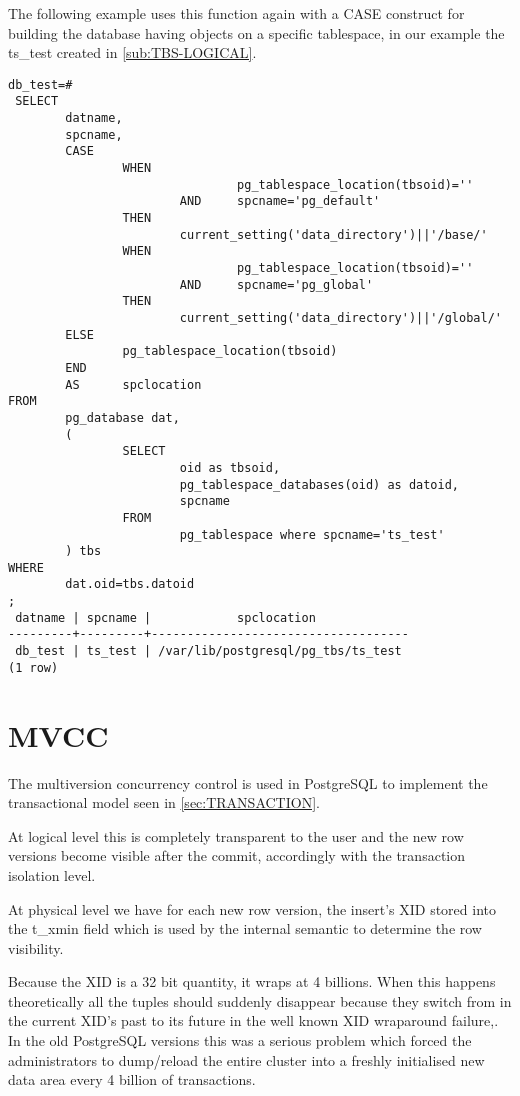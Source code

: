The following example uses this function again with a CASE construct for building the database having
objects on a specific tablespace, in our example the ts\_test created in \ref{sub:TBS-LOGICAL}.\newpage
\begin{lstlisting}[style=pgsql]
 db_test=#
 SELECT
        datname,
        spcname,
        CASE
                WHEN
                                pg_tablespace_location(tbsoid)=''
                        AND     spcname='pg_default'
                THEN
                        current_setting('data_directory')||'/base/'
                WHEN
                                pg_tablespace_location(tbsoid)=''
                        AND     spcname='pg_global'
                THEN
                        current_setting('data_directory')||'/global/'
        ELSE
                pg_tablespace_location(tbsoid)
        END
        AS      spclocation
FROM
        pg_database dat,
        (
                SELECT
                        oid as tbsoid,
                        pg_tablespace_databases(oid) as datoid,
                        spcname
                FROM
                        pg_tablespace where spcname='ts_test'
        ) tbs
WHERE
        dat.oid=tbs.datoid
;
 datname | spcname |            spclocation
---------+---------+------------------------------------
 db_test | ts_test | /var/lib/postgresql/pg_tbs/ts_test
(1 row)

\end{lstlisting}



\section{MVCC} \label{sec:MVCC}
The multiversion concurrency control is used in PostgreSQL to implement the  transactional model seen in
\ref{sec:TRANSACTION}.\newline

At logical level this is completely transparent to the user and the new row versions become visible
after the commit, accordingly with the transaction isolation level. \newline

At physical level we have for each new row version, the insert's XID stored into the t\_xmin field which is
used by the internal semantic to determine the row visibility.

Because the XID is a 32 bit quantity, it wraps at 4 billions. When this happens theoretically all
the tuples should suddenly disappear because they switch from in the current XID's past to its future in
the well known XID wraparound failure,. In the old PostgreSQL versions this
was a serious problem which forced the administrators to dump/reload the entire cluster into a freshly
initialised new data area every 4 billion of transactions.\newline

